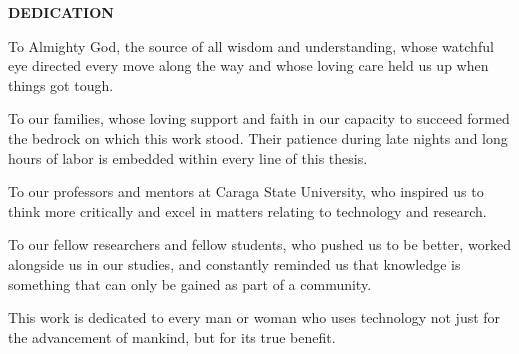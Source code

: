 \thispagestyle{fancy}
\vspace*{-1.5cm}
\begin{center}
\textbf{\fontsize{14}{16}\selectfont DEDICATION}
\end{center}

\vspace{1cm}

To Almighty God, the source of all wisdom and understanding, whose watchful eye directed every move along the way and whose loving care held us up when things got tough.

\vspace{1em}

To our families, whose loving support and faith in our capacity to succeed formed the bedrock on which this work stood. Their patience during late nights and long hours of labor is embedded within every line of this thesis.

\vspace{1em}

To our professors and mentors at Caraga State University, who inspired us to think more critically and excel in matters relating to technology and research.

\vspace{1em}

To our fellow researchers and fellow students, who pushed us to be better, worked alongside us in our studies, and constantly reminded us that knowledge is something that can only be gained as part of a community.

\vspace{1em}

This work is dedicated to every man or woman who uses technology not just for the advancement of mankind, but for its true benefit.